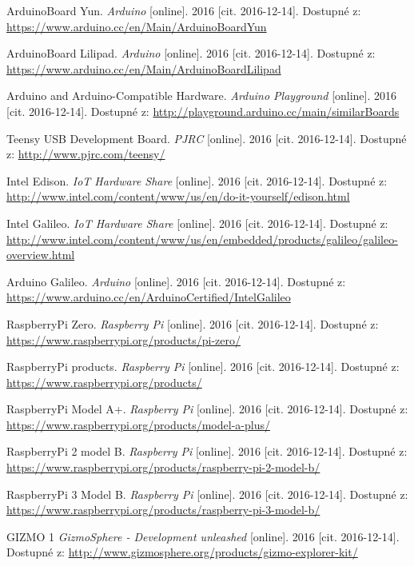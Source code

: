 \begin{literatura}{99}
 ArduinoBoard Yun. \textit{Arduino} [online]. 2016 [cit. 2016-12-14]. Dostupné z: \url{https://www.arduino.cc/en/Main/ArduinoBoardYun}

 ArduinoBoard Lilipad. \textit{Arduino} [online]. 2016 [cit. 2016-12-14]. Dostupné z: \url{https://www.arduino.cc/en/Main/ArduinoBoardLilipad}

 Arduino and Arduino-Compatible Hardware. \textit{Arduino Playground} [online]. 2016 [cit. 2016-12-14]. Dostupné z: \url{http://playground.arduino.cc/main/similarBoards}

 Teensy USB Development Board. \textit{PJRC} [online]. 2016 [cit. 2016-12-14]. Dostupné z: \url{http://www.pjrc.com/teensy/}

 Intel Edison. \textit{IoT Hardware Share} [online]. 2016 [cit. 2016-12-14]. Dostupné z: \url{http://www.intel.com/content/www/us/en/do-it-yourself/edison.html}

 Intel Galileo. \textit{IoT Hardware Share} [online]. 2016 [cit. 2016-12-14]. Dostupné z: \url{http://www.intel.com/content/www/us/en/embedded/products/galileo/galileo-overview.html}

 Arduino Galileo. \textit{Arduino} [online]. 2016 [cit. 2016-12-14]. Dostupné z: \url{https://www.arduino.cc/en/ArduinoCertified/IntelGalileo}

 RaspberryPi Zero. \textit{Raspberry Pi} [online]. 2016 [cit. 2016-12-14]. Dostupné z: \url{https://www.raspberrypi.org/products/pi-zero/}
				
 RaspberryPi products. \textit{Raspberry Pi} [online]. 2016 [cit. 2016-12-14]. Dostupné z: \url{https://www.raspberrypi.org/products/}

 RaspberryPi Model A+. \textit{Raspberry Pi} [online]. 2016 [cit. 2016-12-14]. Dostupné z: \url{https://www.raspberrypi.org/products/model-a-plus/}

 RaspberryPi 2 model B. \textit{Raspberry Pi} [online]. 2016 [cit. 2016-12-14]. Dostupné z: \url{https://www.raspberrypi.org/products/raspberry-pi-2-model-b/}

 RaspberryPi 3 Model B. \textit{Raspberry Pi} [online]. 2016 [cit. 2016-12-14]. Dostupné z: \url{https://www.raspberrypi.org/products/raspberry-pi-3-model-b/}
				
 GIZMO 1 \textit{GizmoSphere - Development unleashed} [online]. 2016 [cit. 2016-12-14]. Dostupné z: \url{http://www.gizmosphere.org/products/gizmo-explorer-kit/}


\end{literatura}
